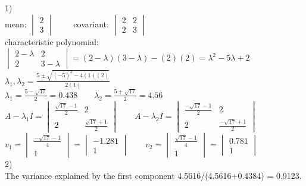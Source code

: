 \documentclass[11pt]{article}
\begin{document}
1) \\
mean: 
$
\begin{vmatrix}
2 \\
3
\end{vmatrix}
\qquad
$
covariant:
$ 
\begin{vmatrix}
2 & 2 \\
2 & 3
\end{vmatrix}
$ \\ 

characteristic polynomial:
$ 
\begin{vmatrix}
2 - \lambda & 2 \\
2 & 3 - \lambda
\end{vmatrix}
= 
(2-\lambda)(3-\lambda) - (2)(2) = \lambda^2 - 5\lambda + 2
$ \\

$
\lambda_1, \lambda_2 =\frac{5\pm\sqrt{(-5)^2-4(1)(2)}}{2(1)}
$ \\

$
\lambda_1 = \frac{5-\sqrt{17}}{2} = 0.438 \qquad \lambda_2 = \frac{5+\sqrt{17}}{2} = 4.56
$ \\

$
A - \lambda_1 I = 
\begin{vmatrix}
 \frac{\sqrt{17} - 1}{2} & 2 \\
2 &  \frac{\sqrt{17} + 1}{2} 
\end{vmatrix}
 \qquad 
 A- \lambda_2 I =  
 \begin{vmatrix}
 \frac{-\sqrt{17} - 1}{2} & 2 \\
2 &  \frac{-\sqrt{17} + 1}{2} 
\end{vmatrix}
$ \\ 

$
v_1 = 
\begin{vmatrix}
\frac{-\sqrt{17}-1}{4} \\ 
1
\end{vmatrix} 
= 
\begin{vmatrix}
-1.281 \\ 
1
\end{vmatrix} 
\qquad
v_2 = 
\begin{vmatrix}
\frac{\sqrt{17}-1}{4} \\ 
1
\end{vmatrix}
= 
\begin{vmatrix}
0.781 \\ 
1
\end{vmatrix} 
$ \\


2) \\
The variance explained by the first component 4.5616/(4.5616+0.4384) = 0.9123.
\end{document}
